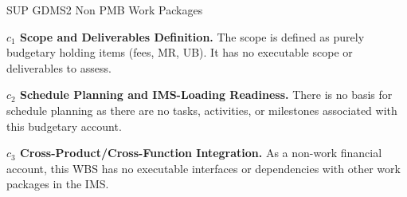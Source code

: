 %
\begin{frame}{SUP GDMS2 Non PMB Work Packages}
\begin{minipage}{0.90\textwidth}
\raggedright
\fontsize{8}{9.5}\selectfont
\textbf{\(c_1\) Scope and Deliverables Definition.}
The scope is defined as purely budgetary holding items (fees, MR, UB). It has no executable scope or deliverables to assess.\par\vspace{0.6em}
\textbf{\(c_2\) Schedule Planning and IMS-Loading Readiness.}
There is no basis for schedule planning as there are no tasks, activities, or milestones associated with this budgetary account.\par\vspace{0.6em}
\textbf{\(c_3\) Cross-Product/Cross-Function Integration.}
As a non-work financial account, this WBS has no executable interfaces or dependencies with other work packages in the IMS.\par\vspace{0.6em}
\end{minipage}
\end{frame}

\endinput
